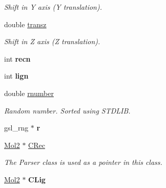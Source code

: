\begin{DoxyCompactItemize}
\begin{DoxyCompactList}\small\item\em Shift in Y axis (Y translation). \item\end{DoxyCompactList}\item 
\hypertarget{classRAND_a380ce56574c3a85086273ae06a99eeb5}{
double \hyperlink{classRAND_a380ce56574c3a85086273ae06a99eeb5}{transz}}
\label{classRAND_a380ce56574c3a85086273ae06a99eeb5}

\begin{DoxyCompactList}\small\item\em Shift in Z axis (Z translation). \item\end{DoxyCompactList}\item 
\hypertarget{classRAND_a11fbfdeb2fd30c895648e1f300b0e246}{
int {\bfseries recn}}
\label{classRAND_a11fbfdeb2fd30c895648e1f300b0e246}

\item 
\hypertarget{classRAND_a45b426525fdbf2db4fdf9f346187e671}{
int {\bfseries lign}}
\label{classRAND_a45b426525fdbf2db4fdf9f346187e671}

\item 
\hypertarget{classRAND_a79b42d6d365a8c753d8d837d1852ef42}{
double \hyperlink{classRAND_a79b42d6d365a8c753d8d837d1852ef42}{rnumber}}
\label{classRAND_a79b42d6d365a8c753d8d837d1852ef42}

\begin{DoxyCompactList}\small\item\em Random number. Sorted using STDLIB. \item\end{DoxyCompactList}\item 
\hypertarget{classRAND_a00b5bec2d57322e3a2f4dfa0d6cf5b93}{
gsl\_\-rng $\ast$ {\bfseries r}}
\label{classRAND_a00b5bec2d57322e3a2f4dfa0d6cf5b93}

\item 
\hypertarget{classRAND_aa5e637e9e5d6795687fc8a24af274500}{
\hyperlink{classMol2}{Mol2} $\ast$ \hyperlink{classRAND_aa5e637e9e5d6795687fc8a24af274500}{CRec}}
\label{classRAND_aa5e637e9e5d6795687fc8a24af274500}

\begin{DoxyCompactList}\small\item\em The Parser class is used as a pointer in this class. \item\end{DoxyCompactList}\item 
\hypertarget{classRAND_a3c3789197ce847841b108f3364cb53f1}{
\hyperlink{classMol2}{Mol2} $\ast$ {\bfseries CLig}}
\label{classRAND_a3c3789197ce847841b108f3364cb53f1}

\end{DoxyCompactItemize}


